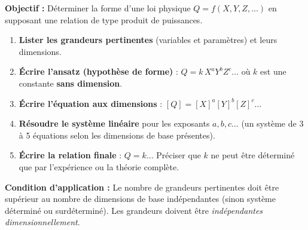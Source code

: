 \documentclass[11pt]{article}
\begin{document}
\begin{methode}
    \textbf{Objectif :} Déterminer la forme d'une loi physique $Q = f(X, Y, Z, \dots)$ en supposant une relation de type produit de puissances.
    \begin{enumerate}
        \item \textbf{Lister les grandeurs pertinentes} (variables et paramètres) et leurs dimensions.
        \item \textbf{Écrire l'ansatz (hypothèse de forme)} : $Q = k \, X^a Y^b Z^c \dots$ où $k$ est une constante \textbf{sans dimension}.
        \item \textbf{Écrire l'équation aux dimensions} : $[Q] = [X]^a [Y]^b [Z]^c \dots$
        \item \textbf{Résoudre le système linéaire} pour les exposants $a, b, c \dots$ (un système de 3 à 5 équations selon les dimensions de base présentes).
        \item \textbf{Écrire la relation finale} : $Q = k \dots$ Préciser que $k$ ne peut être déterminé que par l'expérience ou la théorie complète.
    \end{enumerate}
    \textbf{Condition d'application :} Le nombre de grandeurs pertinentes doit être supérieur au nombre de dimensions de base indépendantes (sinon système déterminé ou surdéterminé). Les grandeurs doivent être \emph{indépendantes dimensionnellement}.
\end{methode}
\end{document}
